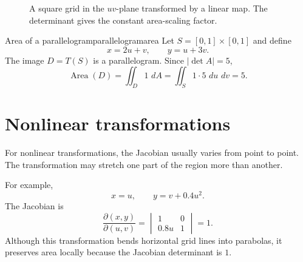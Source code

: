 \documentclass[11pt]{article}
\newcommand{\dd}{\,d}
\newcommand{\Area}{\operatorname{Area}}
\begin{document}
\begin{figure}[H]
\centering
{}
\caption{A square grid in the $uv$-plane transformed by a linear map. The determinant gives the constant area-scaling factor.}
\end{figure}

\begin{workedexample}{Area of a parallelogram}{parallelogramarea}
Let $S=[0,1]\times[0,1]$ and define
\[
x=2u+v,\qquad y=u+3v.
\]
The image $D=T(S)$ is a parallelogram. Since $|\det A|=5$,
\[
\Area(D)=\iint_D1\,\dd A=\iint_S 1\cdot5\,\dd u\,\dd v=5.
\]
\end{workedexample}

\section{Nonlinear transformations}

For nonlinear transformations, the Jacobian usually varies from point to point. The transformation may stretch one part of the region more than another.

For example,
\[
x=u,\qquad y=v+0.4u^2.
\]
The Jacobian is
\[
\frac{\partial(x,y)}{\partial(u,v)}=\begin{vmatrix}1&0\\0.8u&1\end{vmatrix}=1.
\]
Although this transformation bends horizontal grid lines into parabolas, it preserves area locally because the Jacobian determinant is $1$.
\end{document}
